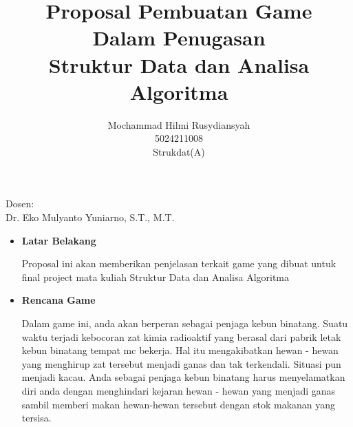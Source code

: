 \documentclass[12pt]{extarticle}
\title{Proposal Pembuatan Game\\Dalam Penugasan\\Struktur Data dan Analisa Algoritma}
\author{Mochammad Hilmi Rusydiansyah\\5024211008\\Strukdat(A)}
\begin{document}
	
	\maketitle
	\begin{center}
		\large{
			Dosen:
			\\
			Dr. Eko Mulyanto Yuniarno, S.T., M.T.
		}
	\end{center}
	\newpage
	
	\begin{itemize}
		\item \large{\textbf{Latar Belakang}}
			\begin{description}
				Proposal ini akan memberikan penjelasan terkait game yang dibuat untuk final project mata kuliah Struktur Data dan Analisa Algoritma
			\end{description}
		\item \large{\textbf{Rencana Game}}
			\begin{description}
				Dalam game ini, anda akan berperan sebagai penjaga kebun binatang. Suatu waktu terjadi kebocoran zat kimia radioaktif yang berasal dari pabrik letak kebun binatang tempat mc bekerja. Hal itu mengakibatkan hewan - hewan yang menghirup zat tersebut menjadi ganas dan tak terkendali. Situasi pun menjadi kacau. Anda sebagai penjaga kebun binatang harus menyelamatkan diri anda dengan menghindari kejaran hewan - hewan yang menjadi ganas sambil memberi makan hewan-hewan tersebut dengan stok makanan yang tersisa.
			\end{description}
	\end{itemize}
	
	
\end{document}
